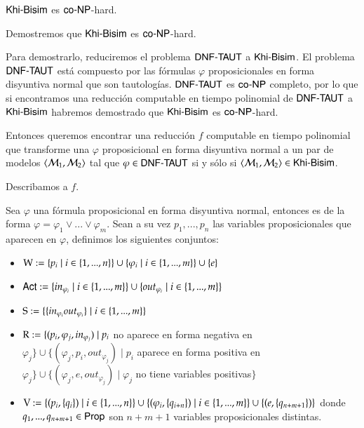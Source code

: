 \begin{lema}
    $\KHiBisim$ es $\coNP$-hard.
\end{lema}

\begin{demostracion}

    Demostremos que $\KHiBisim$ es $\coNP$-hard.

    Para demostrarlo, reduciremos el problema $\DNFTAUT$ a $\KHiBisim$. El problema $\DNFTAUT$ está compuesto 
    por las fórmulas $\varphi$ proposicionales en forma disyuntiva normal que son tautologías. 
    $\DNFTAUT$ es $\coNP$ completo, por lo que si encontramos una reducción computable en tiempo polinomial de 
    $\DNFTAUT$ a $\KHiBisim$ habremos demostrado que $\KHiBisim$ es $\coNP$-hard.

    Entonces queremos encontrar una reducción $f$ computable en tiempo polinomial que transforme una $\varphi$ proposicional 
    en forma disyuntiva normal a un par de modelos $\tup{\modults_1,\modults_2}$ tal que $\varphi \in \DNFTAUT$ si y sólo si 
    $\tup{\modults_1,\modults_2} \in \KHiBisim$.

    Describamos a $f$.

    Sea $\varphi$ una fórmula proposicional en forma disyuntiva normal, entonces es de la forma 
    $\varphi = \varphi_1 \vee ... \vee \varphi_m$. Sean a su vez $p_1,...,p_n$ las variables proposicionales que aparecen en $\varphi$, 
    definimos los siguientes conjuntos:

    \begin{itemize}
        \item $\W := \{p_i\mid i\in\{1,...,n\}\} \cup \{\varphi_i \mid i \in \{1,...,m\}\} \cup \{e\}$
        \item $\ACT := \{in_{\varphi_i} \mid i \in \{1,...,m\}\} \cup \{out_{\varphi_i} \mid i \in \{1,...,m\}\}$
        \item $\S := \{\{in_{\varphi_i}out_{\varphi_i}\} \mid i \in \{1,...,m\}\}$
        \item $\R := \{(p_i,\varphi_j,in_{\varphi_j}) \mid p_i$ no aparece en forma negativa en $\varphi_j\} \cup 
                     \{(\varphi_j,p_i,out_{\varphi_j})\mid p_i$ aparece en forma positiva en $\varphi_j\} \cup 
                     \{(\varphi_j,e,out_{\varphi_j}) \mid \varphi_j$ no tiene variables positivas$\}$
        \item $\V := \{(p_i,\{q_i\}) \mid i \in \{1,...,n\}\} \cup 
                     \{(\varphi_i,\{q_{i+n}\}) \mid i \in \{1,...,m\}\} \cup 
                     \{(e,\{q_{n+m+1}\})\}$ donde $q_1,...,q_{n+m+1} \in \PROP$ son $n+m+1$ variables proposicionales distintas.
    \end{itemize}


\end{demostracion}
